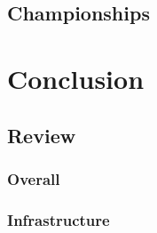 \documentclass[11pt]{report}
\begin{document}
\section{Championships}


\chapter{Conclusion}

\section{Review}
\subsection{Overall}
\subsection{Infrastructure}


\printbibliography[heading=bibintoc]
\end{document}
